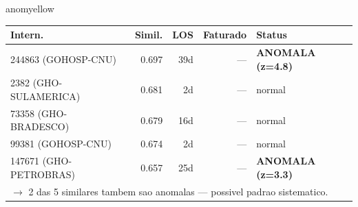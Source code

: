 \documentclass[a4paper,10pt]{article}
\begin{document}
\begin{anomalycard}[Internacao 166766 | GHO-PETROBRAS | MODERADO (z=2.32)]{anomyellow}
\begin{tabular}{l r r r l}\toprule\textbf{Intern.} & \textbf{Simil.} & \textbf{LOS} & \textbf{Faturado} & \textbf{Status} \\\midrule
244863 (GOHOSP-CNU) & 0.697 & 39d & --- & \textcolor{anomred}{\textbf{ANOMALA (z=4.8)}} \\
2382 (GHO-SULAMERICA) & 0.681 & 2d & --- & \textcolor{jcubeblue}{normal} \\
73358 (GHO-BRADESCO) & 0.679 & 16d & --- & \textcolor{jcubeblue}{normal} \\
99381 (GOHOSP-CNU) & 0.674 & 2d & --- & \textcolor{jcubeblue}{normal} \\
147671 (GHO-PETROBRAS) & 0.657 & 25d & --- & \textcolor{anomred}{\textbf{ANOMALA (z=3.3)}} \\
\multicolumn{5}{l}{\textcolor{anomred}{\small $\rightarrow$ 2 das 5 similares tambem sao anomalas --- possivel padrao sistematico.}} \\
\bottomrule\end{tabular}


\end{anomalycard}

\newpage
\end{document}
